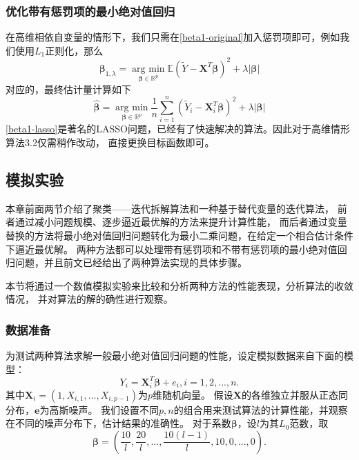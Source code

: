 \subsubsection{优化带有惩罚项的最小绝对值回归}
在高维相依自变量的情形下，我们只需在\eqref{beta1-original}加入惩罚项即可，例如我们使用$L_1$正则化，那么
\begin{equation}
    \bm{\beta}_{1, \lambda} =\underset{\bm{\beta} \in \mathbb{R}^{p}}{\operatorname{arg\ min}} 
    \mathbb{E}(\tilde Y - \bm{X}^T \bm{\beta})^2 + \lambda|\bm{\beta}|
\end{equation}
对应的，最终估计量计算如下
\begin{equation}\label{beta1-lasso}
    \hat{\bm{\beta}} = \underset{\bm{\beta} \in \mathbb{R}^{p}}{\operatorname{arg\ min}}
    \frac1{n} \sum_{i=1}^n(\tilde{Y}_i - \bm{X}_i^T\bm{\beta})^2 + \lambda|\bm{\beta}|
\end{equation}
\eqref{beta1-lasso}是著名的LASSO问题，已经有了快速解决的算法。因此对于高维情形算法3.2仅需稍作改动，
直接更换目标函数即可。

\subsection{模拟实验}
本章前面两节介绍了聚类——迭代拆解算法和一种基于替代变量的迭代算法，
前者通过减小问题规模、逐步逼近最优解的方法来提升计算性能，
而后者通过变量替换的方法将最小绝对值回归问题转化为最小二乘问题，在给定一个相合估计条件下逼近最优解。
两种方法都可以处理带有惩罚项和不带有惩罚项的最小绝对值回归问题，并且前文已经给出了两种算法实现的具体步骤。

本节将通过一个数值模拟实验来比较和分析两种方法的性能表现，分析算法的收敛情况，
并对算法的解的确性进行观察。

\subsubsection{数据准备}
为测试两种算法求解一般最小绝对值回归问题的性能，设定模拟数据来自下面的模型：
\begin{equation*}
    {Y}_i = \bm{X}_i^T \bm{\beta} + e_i, i = 1, 2, ..., n.
\end{equation*}
其中$\bm{X}_i = (1, X_{i,1}, ..., X_{i, p-1})$为$p$维随机向量。
假设$\bm{X}$的各维独立并服从正态同分布，$\bm{e}$为高斯噪声。
我们设置不同$p, n$的组合用来测试算法的计算性能，并观察在不同的噪声分布下，估计结果的准确性。
对于系数$\bm{\beta}$，设$l$为其$L_0$范数，取
$$
    \bm{\beta} = (\frac{10}{l}, \frac{20}{l}, ..., \frac{10(l-1)}{l}, 10, 0, ..., 0).
$$

